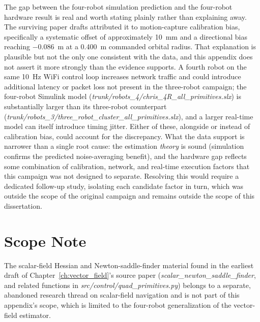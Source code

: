\documentclass[12pt, letterpaper, oneside]{report}
\begin{document}
The gap between the four-robot simulation prediction and the four-robot
hardware result is real and worth stating plainly rather than
explaining away. The surviving paper drafts attributed it to
motion-capture calibration bias, specifically a systematic offset of
approximately 10~mm and a directional bias reaching $-0.086$~m at a
0.400~m commanded orbital radius. That explanation is plausible but not
the only one consistent with the data, and this appendix does not
assert it more strongly than the evidence supports. A fourth robot on
the same 10~Hz WiFi control loop increases network traffic and could
introduce additional latency or packet loss not present in the
three-robot campaign; the four-robot Simulink model
(\textit{trunk/robots\_4/chris\_4R\_all\_primitives.slx}) is
substantially larger than its three-robot counterpart
(\textit{trunk/robots\_3/three\_robot\_cluster\_all\_primitives.slx}),
and a larger real-time model can itself introduce timing jitter. Either
of these, alongside or instead of calibration bias, could account for
the discrepancy. What the data support is narrower than a single root
cause: the estimation \emph{theory} is sound (simulation confirms the
predicted noise-averaging benefit), and the hardware gap reflects some
combination of calibration, network, and real-time execution factors
that this campaign was not designed to separate. Resolving this would
require a dedicated follow-up study, isolating each candidate factor in
turn, which was outside the scope of the original campaign and remains
outside the scope of this dissertation.

\section{Scope Note}

The scalar-field Hessian and Newton-saddle-finder material found in the
earliest draft of Chapter~\ref{ch:vector_field}'s source paper
(\textit{scalar\_newton\_saddle\_finder}, and related functions in
\textit{src/control/quad\_primitives.py}) belongs to a separate,
abandoned research thread on scalar-field navigation and is not part of
this appendix's scope, which is limited to the four-robot generalization
of the vector-field estimator.
\end{document}
